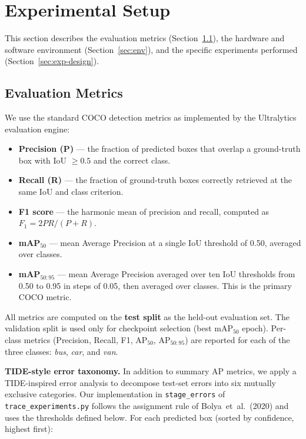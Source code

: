 \section{Experimental Setup}
\label{sec:experiments}

This section describes the evaluation metrics
(Section~\ref{sec:metrics}), the hardware and software environment
(Section~\ref{sec:env}), and the specific experiments performed
(Section~\ref{sec:exp-design}).

\subsection{Evaluation Metrics}
\label{sec:metrics}

We use the standard COCO detection metrics as implemented by the
Ultralytics evaluation engine:

\begin{itemize}
  \item \textbf{Precision (P)} — the fraction of predicted boxes that
        overlap a ground-truth box with IoU $\ge 0.5$ and the correct class.
  \item \textbf{Recall (R)} — the fraction of ground-truth boxes correctly
        retrieved at the same IoU and class criterion.
  \item \textbf{F1 score} — the harmonic mean of precision and recall,
        computed as $F_1 = 2PR/(P+R)$.
  \item \textbf{mAP$_{50}$} — mean Average Precision at a single IoU
        threshold of 0.50, averaged over classes.
  \item \textbf{mAP$_{50:95}$} — mean Average Precision averaged over
        ten IoU thresholds from 0.50 to 0.95 in steps of 0.05, then
        averaged over classes.  This is the primary COCO metric.
\end{itemize}

All metrics are computed on the \textbf{test split} as the held-out
evaluation set.
The validation split is used only for checkpoint selection (best
mAP$_{50}$ epoch).
Per-class metrics (Precision, Recall, F1, AP$_{50}$, AP$_{50:95}$) are
reported for each of the three classes: \textit{bus}, \textit{car}, and
\textit{van}.

\textbf{TIDE-style error taxonomy.}
In addition to summary AP metrics, we apply a TIDE-inspired error analysis
\cite{bolya2020tide} to decompose test-set errors into six mutually exclusive
categories.
Our implementation in \texttt{stage\_errors} of
\texttt{trace\_experiments.py} follows the assignment rule of
Bolya~et~al.\ (2020) and uses the thresholds defined below.
For each predicted box (sorted by confidence, highest first):

